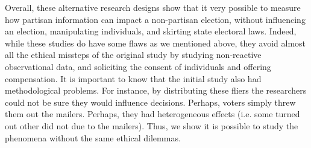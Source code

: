 \documentclass[12pt]{article}
\begin{document}
Overall, these alternative research designs show that it very possible to measure how partisan information can impact a non-partisan election, without influencing an election, manipulating individuals, and skirting state electoral laws. Indeed, while these studies do have some flaws as we mentioned above, they avoid almost all the ethical missteps of the original study by studying non-reactive observational data, and soliciting the consent of individuals and offering compensation. It is important to know that the initial study also had methodological problems. For instance, by distributing these fliers the researchers could not be sure they would influence decisions. Perhaps, voters simply threw them out the mailers. Perhaps, they had heterogeneous effects (i.e. some turned out other did not due to the mailers). Thus, we show it is possible to study the phenomena without the same ethical dilemmas. 


\newpage




\nocite{*}
\end{document}
